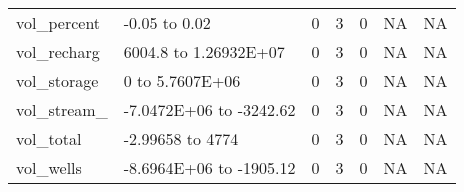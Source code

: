 \documentclass{article}
\begin{document}
\begin{center}
\begin{landscape}
\begin{longtable}{llrrlll}
vol\_percent &           -0.05 to  0.02 &                0 &            3 &      0 &                 NA &                  NA \\
vol\_recharg &    6004.8 to 1.26932E+07 &                0 &            3 &      0 &                 NA &                  NA \\
vol\_storage &          0 to 5.7607E+06 &                0 &            3 &      0 &                 NA &                  NA \\
vol\_stream\_ &  -7.0472E+06 to -3242.62 &                0 &            3 &      0 &                 NA &                  NA \\
  vol\_total &        -2.99658 to  4774 &                0 &            3 &      0 &                 NA &                  NA \\
  vol\_wells &  -8.6964E+06 to -1905.12 &                0 &            3 &      0 &                 NA &                  NA \\
\end{longtable}
\end{landscape}
\end{center}
\end{document}

